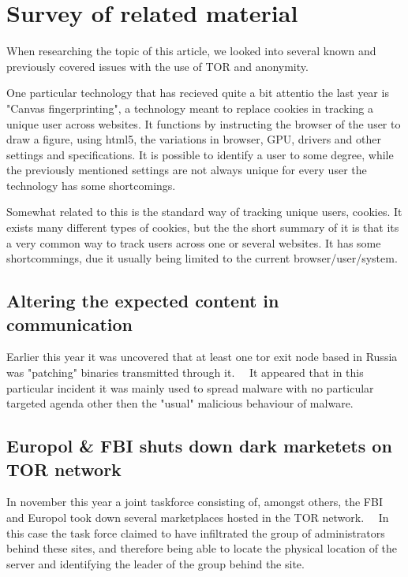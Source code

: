 \section{Survey of related material}
\label{sec:related}
When researching the topic of this article, we looked into several known and previously covered issues with the use of TOR and anonymity.

One particular technology that has recieved quite a bit attentio the last year is "Canvas fingerprinting", a technology meant to replace cookies in tracking a unique user across websites. It functions by instructing the browser of the user to draw a figure, using html5, the variations in browser, GPU, drivers and other settings and specifications. It is possible to identify a user to some degree, while the previously mentioned settings are not always unique for every user the technology has some shortcomings.~\cite{wiki_canvas}

Somewhat related to this is the standard way of tracking unique users, cookies.
It exists many different types of cookies, but the the short summary of it is that its a very common way to track users across one or several websites. It has some shortcommings, due it usually being limited to the current browser/user/system.~\cite{wiki_cookie}

\subsection{Altering the expected content in communication} %
Earlier this year it was uncovered that at least one tor exit node based in Russia was "patching" binaries transmitted through it.~\cite{fsecapt}~\cite{lev_bin_apt}
It appeared that in this particular incident it was mainly used to spread malware with no particular targeted agenda other then the "usual" malicious behaviour of malware.


\subsection{Europol \& FBI shuts down dark marketets on TOR network}

In november this year a joint taskforce consisting of, amongst others, the FBI and Europol took down several marketplaces hosted in the TOR network.~\cite{wired_tor_bust}~\cite{euro_tor_bust}
In this case the task force claimed to have infiltrated the group of administrators behind these sites, and therefore being able to locate the physical location of the server and identifying the leader of the group behind the site.


